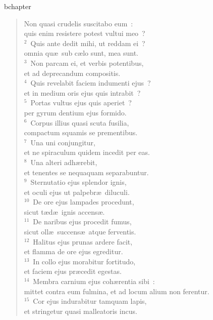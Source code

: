 bchapter\begin{flushleft}\begin{verse}\vspace{-19pt}\hspace{6pt}Non quasi crudelis suscitabo eum~:\\\hspace{6pt} quis enim resistere potest vultui meo~?\\
${}^{2}$~Quis ante dedit mihi, ut reddam ei~?\\ omnia qu\ae\ sub c\ae lo sunt, mea sunt.\\
${}^{3}$~Non parcam ei, et verbis potentibus,\\ et ad deprecandum compositis.\\
${}^{4}$~Quis revelabit faciem indumenti ejus~?\\ et in medium oris ejus quis intrabit~?\\
${}^{5}$~Portas vultus ejus quis aperiet~?\\ per gyrum dentium ejus formido.\\
${}^{6}$~Corpus illius quasi scuta fusilia,\\ compactum squamis se prementibus.\\
${}^{7}$~Una uni conjungitur,\\ et ne spiraculum quidem incedit per eas.\\
${}^{8}$~Una alteri adh\ae rebit,\\ et tenentes se nequaquam separabuntur.\\
${}^{9}$~Sternutatio ejus splendor ignis,\\ et oculi ejus ut palpebr\ae\ diluculi.\\
${}^{10}$~De ore ejus lampades procedunt,\\ sicut t\ae d\ae\ ignis accens\ae .\\
${}^{11}$~De naribus ejus procedit fumus,\\ sicut oll\ae\ succens\ae\ atque ferventis.\\
${}^{12}$~Halitus ejus prunas ardere facit,\\ et flamma de ore ejus egreditur.\\
${}^{13}$~In collo ejus morabitur fortitudo,\\ et faciem ejus pr\ae cedit egestas.\\
${}^{14}$~Membra carnium ejus coh\ae rentia sibi~:\\ mittet contra eum fulmina, et ad locum alium non ferentur.\\
${}^{15}$~Cor ejus indurabitur tamquam lapis,\\ et stringetur quasi malleatoris incus.\\

\end{verse}
\end{flushleft}
